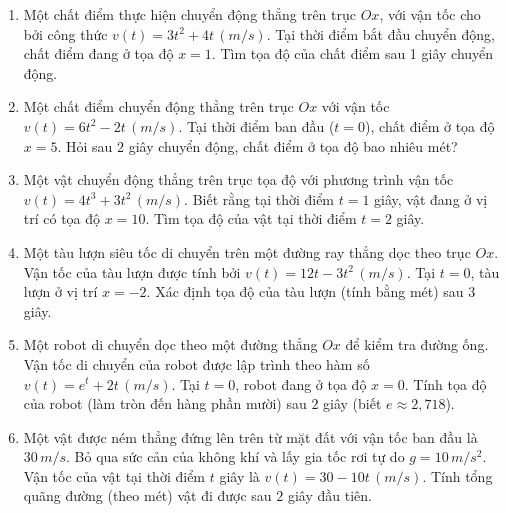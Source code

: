 \documentclass[12pt]{article}
\begin{document}
	\begin{enumerate}[label=\textbf{Câu \arabic*.}, start=1]
		
		\item Một chất điểm thực hiện chuyển động thẳng trên trục $Ox$, với vận tốc cho bởi công thức $v(t) = 3t^2 + 4t \, (m/s)$. Tại thời điểm bắt đầu chuyển động, chất điểm đang ở tọa độ $x = 1$. Tìm tọa độ của chất điểm sau 1 giây chuyển động.
		\vspace{0.75cm}
		
		\item Một chất điểm chuyển động thẳng trên trục $Ox$ với vận tốc $v(t) = 6t^2 - 2t \, (m/s)$. Tại thời điểm ban đầu ($t=0$), chất điểm ở tọa độ $x = 5$. Hỏi sau $2$ giây chuyển động, chất điểm ở tọa độ bao nhiêu mét?
		\vspace{0.75cm}
		
		\item Một vật chuyển động thẳng trên trục tọa độ với phương trình vận tốc $v(t) = 4t^3 + 3t^2 \, (m/s)$. Biết rằng tại thời điểm $t = 1$ giây, vật đang ở vị trí có tọa độ $x = 10$. Tìm tọa độ của vật tại thời điểm $t = 2$ giây.
		\vspace{0.75cm}
		
		\item Một tàu lượn siêu tốc di chuyển trên một đường ray thẳng dọc theo trục $Ox$. Vận tốc của tàu lượn được tính bởi $v(t) = 12t - 3t^2 \, (m/s)$. Tại $t = 0$, tàu lượn ở vị trí $x = -2$. Xác định tọa độ của tàu lượn (tính bằng mét) sau $3$ giây.
		\vspace{0.75cm}
		
		\item Một robot di chuyển dọc theo một đường thẳng $Ox$ để kiểm tra đường ống. Vận tốc di chuyển của robot được lập trình theo hàm số $v(t) = e^t + 2t \, (m/s)$. Tại $t=0$, robot đang ở tọa độ $x = 0$. Tính tọa độ của robot (làm tròn đến hàng phần mười) sau $2$ giây (biết $e \approx 2,718$).
		\vspace{0.75cm}
		
		\item Một vật được ném thẳng đứng lên trên từ mặt đất với vận tốc ban đầu là $30 \, m/s$. Bỏ qua sức cản của không khí và lấy gia tốc rơi tự do $g = 10 \, m/s^2$. Vận tốc của vật tại thời điểm $t$ giây là $v(t) = 30 - 10t \, (m/s)$. Tính tổng quãng đường (theo mét) vật đi được sau $2$ giây đầu tiên.
		\vspace{0.75cm}
		

\end{enumerate}
\end{document}
